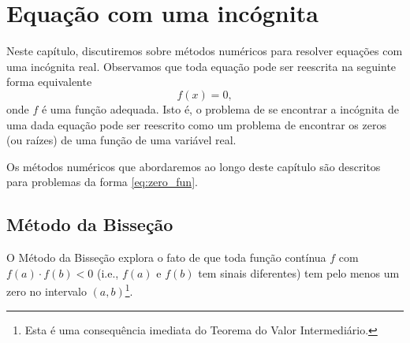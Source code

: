 
\chapter{Equação com uma incógnita}\label{cap_eq1d}
\thispagestyle{fancy}

Neste capítulo, discutiremos sobre métodos numéricos para resolver equações com uma incógnita real. Observamos que toda equação pode ser reescrita na seguinte forma equivalente
\begin{equation}\label{eq:zero_fun}
  f(x) = 0,
\end{equation}
onde $f$ é uma função adequada. Isto é, o problema de se encontrar a incógnita de uma dada equação pode ser reescrito como um problema de encontrar os zeros (ou raízes) de uma função de uma variável real.

Os métodos numéricos que abordaremos ao longo deste capítulo são descritos para problemas da forma \eqref{eq:zero_fun}.

\section{Método da Bisseção}\label{cap_eq1d_sec_bissec}

O Método da Bisseção explora o fato de que toda função contínua $f$ com $f(a)\cdot f(b) < 0$ (i.e., $f(a)$ e $f(b)$ tem sinais diferentes) tem pelo menos um zero no intervalo $(a, b)$\footnote{Esta é uma consequência imediata do Teorema do Valor Intermediário.}.

